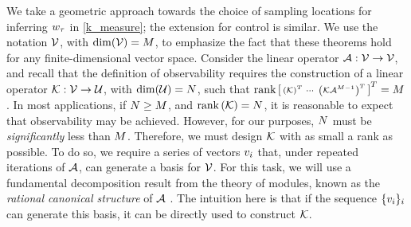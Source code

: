 We take a geometric approach towards the choice of sampling locations for inferring $w_{\tau}$ in  \eqref{k_measure}; the extension for control is similar.  We use the notation $\mathcal{V}$, with $\operatorname{dim}(\mathcal{V})=M$, to emphasize the fact that these theorems hold for any finite-dimensional vector space. Consider the linear operator $\mathcal{A}:\mathcal{V}\rightarrow\mathcal{V}$, and recall that the definition of observability requires the construction of a linear operator $\mathcal{K}:\mathcal{V}\to\mathcal{U}$, with $\dim(\mathcal{U}) = N$, such that 
$\operatorname{rank}\left[
 \begin{smallmatrix}
  \left(\mathcal{K}\right)^T &
  \cdots &
  \left(\mathcal{K} \mathcal{A}^{M-1}\right)^T
 \end{smallmatrix}
 \right]^T = M$. 
In most applications, if $N\geq M$, and $\operatorname{rank}\left(\mathcal{K}\right) = N$, it is reasonable to expect that observability may be achieved. However, for our purposes, $N$ must be \emph{significantly} less than $M$. Therefore, we must design $\mathcal{K}$ with as small a rank as possible. To do so, we require a series of vectors $v_i$ that, under repeated iterations of $\mathcal{A}$, can generate a basis for $\mathcal{V}$. For this task, we will use a fundamental decomposition result from the theory of modules, known as the \emph{rational canonical structure} of $\mathcal{A}$ \cite{wonham1974linear}. The intuition here is that if the sequence $\{v_i\}_{i}$ can generate this basis, it can be directly used to construct $\mathcal{K}$.

